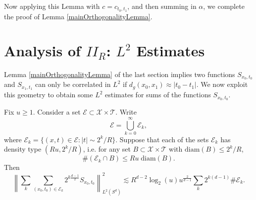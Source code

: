 \begin{comment}
%
\[ R^{\frac{d+1}{2}} \int \int_{E_{x_0}} \int_{F_y^{-1}(E_{x_0})} c_{t_0,t_1}(s) \eta(s,y,z) (\partial^{\frac{d-1}{2}} \widehat{\chi} )(R(s + |z|))\; dz\; dy\; ds. \]
%
TODO: Does integrating by parts in the $t$ and $t'$ variable do anything for us? Is this where we need oscillation. If $|t_0 - t_1 + d_g(x_0,x_1)| \geq 10/R$, then we conclude this quantity is
%
\begin{align*}
    & O_N \Big( R^{\frac{d+1}{2}-N} \int \int_{E_{x_0}} \int_{F_y^{-1}(E_{x_0})} |c_{t_0,t_1}(s)| |\eta(s,y,z)| (s + |z|)^{-N}\; dz\; dy\; ds \Big)\\
    &\quad\quad O_N \Big( R^{\frac{d+1}{2} - N} |t_0 - t_1 + d_g(x_0,x_1)|^{-N} |E_{x_0}| |E_{x_1}| \| c_{t_0,t_1} \|_{L^1} \Big)
\end{align*}
%
If $|E_{x_0}|$ and $|E_{x_1}|$ are both proportional to $1/R^d$, then this quantity is
%
\begin{align*}
    & O_N \Big( R^{-\frac{3d-1}{2} - N} |t_0 - t_1 + d_g(x_0,x_1)|^{-N} \| c_{t_0,t_1} \|_{L^1} \Big)\\
    &\quad = O_N \Big( R^{-\frac{3d-1}{2} - 1/p^* - N} (t_0 - t_1 + d_g(x_0,x_1))^{-N} \| b_{t_0} \|_{L^p} \| b_{t_1} \|_{L^p} \Big)\\
    &\quad = O_N \Big( t_0^{s_p} t_1^{s_p} R^{-\frac{3d-1}{2} - 1/p^* - N} (t_0 - t_1 + d_g(E_{x_0}, E_{x_1}))^{-N} \Big)
\end{align*}

\end{comment}

Now applying this Lemma with $c = c_{t_0,t_1}$, and then summing in $\alpha$, we complete the proof of Lemma \ref{mainOrthogonalityLemma}.


\section{Analysis of $II_R$: $L^2$ Estimates}

Lemma \ref{mainOrthogonalityLemma} of the last section implies two functions ${S\!}_{x_0,t_0}$ and ${S\!}_{x_1,t_1}$ can only be correlated in $L^2$ if $d_g(x_0,x_1) \approx |t_0 - t_1|$. We now exploit this geometry to obtain some $L^2$ estimates for sums of the functions ${S\!}_{x_0,t_0}$.

\begin{lemma}
    Fix $u \geq 1$. Consider a set $\mathcal{E} \subset \mathcal{X} \times \mathcal{T}$. Write
    \[ \mathcal{E} = \bigcup_{k = 0}^\infty \mathcal{E}_k, \]
    where $\mathcal{E}_k = \{ (x,t) \in \mathcal{E}: |t| \sim 2^k / R \}$. Suppose that each of the sets $\mathcal{E}_k$ has density type $(Ru,2^k / R)$, i.e. for any set $B \subset \mathcal{X} \times \mathcal{T}$ with $\text{diam}(B) \leq 2^k / R$,
    \[ \#( \mathcal{E}_k \cap B ) \leq Ru\; \text{diam}(B). \]
    Then
    \[ \left\| \sum_k \sum_{(x_0,t_0) \in \mathcal{E}_k} 2^{k \frac{d-1}{2}} {S\!}_{x_0,t_0} \right\|_{L^2(S^d)}^2 \lesssim R^{d-2} \log_2(u) u^{\frac{2}{d-1}} \sum_k 2^{k(d-1)} \# \mathcal{E}_k. \]
\end{lemma}

